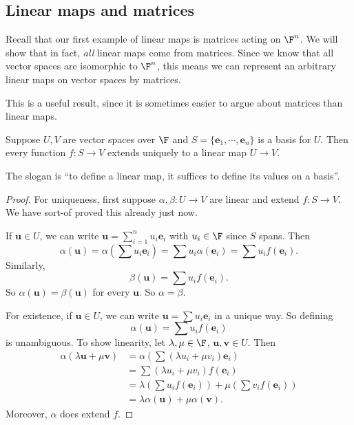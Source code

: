 \documentclass[a4paper]{article}
\begin{document}
\subsection{Linear maps and matrices}
Recall that our first example of linear maps is matrices acting on $\F^n$. We will show that in fact, \emph{all} linear maps come from matrices. Since we know that all vector spaces are isomorphic to $\F^n$, this means we can represent an arbitrary linear maps on vector spaces by matrices.

This is a useful result, since it is sometimes easier to argue about matrices than linear maps.

\begin{prop}
  Suppose $U, V$ are vector spaces over $\F$ and $S = \{\mathbf{e}_1, \cdots, \mathbf{e}_n\}$ is a basis for $U$. Then every function $f: S \to V$ extends uniquely to a linear map $U \to V$.
\end{prop}
The slogan is ``to define a linear map, it suffices to define its values on a basis''.

\begin{proof}
  For uniqueness, first suppose $\alpha, \beta: U \to V$ are linear and extend $f: S \to V$. We have sort-of proved this already just now.

  If $\mathbf{u}\in U$, we can write $\mathbf{u} = \sum_{i = 1}^n u_i \mathbf{e}_i$ with $u_i \in \F$ since $S$ spans. Then
  \[
    \alpha (\mathbf{u}) = \alpha\left(\sum u_i \mathbf{e}_i\right) = \sum u_i \alpha (\mathbf{e}_i) = \sum u_i f( \mathbf{e}_i).
  \]
  Similarly,
  \[
    \beta( \mathbf{u}) = \sum u_i f(\mathbf{e}_i).
  \]
  So $\alpha (\mathbf{u}) = \beta(\mathbf{u})$ for every $\mathbf{u}$. So $\alpha = \beta$.

  For existence, if $\mathbf{u} \in U$, we can write $\mathbf{u} = \sum u_i \mathbf{e}_i$ in a unique way. So defining
  \[
    \alpha(\mathbf{u}) = \sum u_i f(\mathbf{e}_i)
  \]
  is unambiguous. To show linearity, let $\lambda, \mu\in \F$, $\mathbf{u}, \mathbf{v}\in U$. Then
  \begin{align*}
    \alpha (\lambda \mathbf{u} + \mu \mathbf{v}) &= \alpha \left(\sum (\lambda u_i + \mu v_i) \mathbf{e}_i\right) \\
    &= \sum (\lambda u_i + \mu v_i) f(\mathbf{e}_i)\\
    &= \lambda \left(\sum u_i f(\mathbf{e}_i)\right) + \mu \left(\sum v_i f(\mathbf{e}_i)\right)\\
    &= \lambda \alpha(\mathbf{u}) + \mu \alpha(\mathbf{v}).
  \end{align*}
  Moreover, $\alpha$ does extend $f$.
\end{proof}
\end{document}
